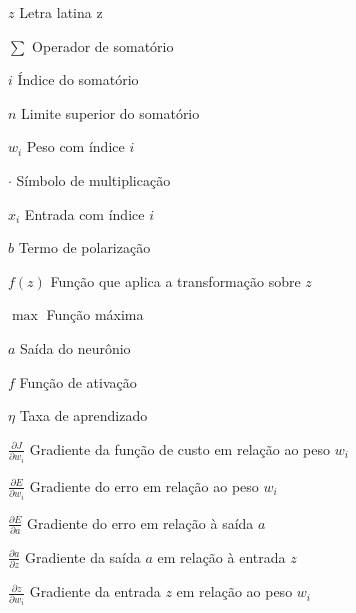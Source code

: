 \documentclass[
	12pt,				%
	openright,			%
	oneside,			%
	a4paper,			%
	brazil				%
	]{abntex2}
\begin{document}
\begin{simbolos}
    \item[$ z $] Letra latina z
    \item[$ \sum $] Operador de somatório
    \item[$ i $] Índice do somatório
    \item[$ n $] Limite superior do somatório
    \item[$ w_i $] Peso com índice \( i \)
    \item[$ \cdot $] Símbolo de multiplicação
    \item[$ x_i $] Entrada com índice \( i \)
    \item[$ b $] Termo de polarização
    \item[$ f(z) $] Função que aplica a transformação sobre \( z \)
    \item[$ \max $] Função máxima
    \item[$ a $] Saída do neurônio
    \item[$ f $] Função de ativação
    \item[$ \eta $] Taxa de aprendizado
    \item[$ \frac{\partial J}{\partial w_i} $] Gradiente da função de custo em relação ao peso \( w_i \)
    \item[$ \frac{\partial E}{\partial w_i} $] Gradiente do erro em relação ao peso \( w_i \)
    \item[$ \frac{\partial E}{\partial a} $] Gradiente do erro em relação à saída \( a \)
    \item[$ \frac{\partial a}{\partial z} $] Gradiente da saída \( a \) em relação à entrada \( z \)
    \item[$ \frac{\partial z}{\partial w_i} $] Gradiente da entrada \( z \) em relação ao peso \( w_i \)
\end{simbolos}




\textual






%

\postextual


\end{document}
